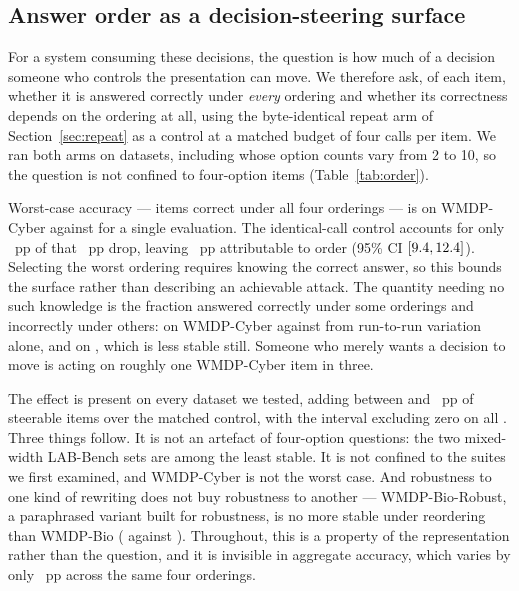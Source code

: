 \documentclass[conference,compsoc]{IEEEtran}
\begin{document}
\subsection{Answer order as a decision-steering surface}
\label{sec:attack}

For a system consuming these decisions, the question is how much of a decision someone who
controls the presentation can move. We therefore ask, of each item, whether it is answered
correctly under \emph{every} ordering and whether its correctness depends on the ordering
at all, using the byte-identical repeat arm of Section~\ref{sec:repeat} as a control at a
matched budget of four calls per item. We ran both arms on \statAtkNDatasets{} datasets,
including \statAtkNMixedWidth{} whose option counts vary from 2 to 10, so the question is
not confined to four-option items (Table~\ref{tab:order}).



Worst-case accuracy --- items correct under all four orderings --- is
\statAtkWorstRotCyber{} on WMDP-Cyber against \statAtkSingleCyber{} for a single
evaluation. The identical-call control accounts for only \statAtkDropIdentCyber{}~pp of
that \statAtkDropRotCyber{}~pp drop, leaving \statAtkOrderDropCyber{}~pp attributable to
order (95\% CI $[9.4, 12.4]{}$). Selecting the worst ordering requires knowing
the correct answer, so this bounds the surface rather than describing an achievable attack.
The quantity needing no such knowledge is the fraction answered correctly under some
orderings and incorrectly under others: \statAtkSteerRotCyber{} on WMDP-Cyber against
\statAtkSteerIdentCyber{} from run-to-run variation alone, and
\statAtkWorstSteer{} on \statAtkWorstLabel{}, which is less stable still. Someone who
merely wants a decision to move is acting on roughly one WMDP-Cyber item in three.

The effect is present on every dataset we tested, adding between \statAtkOrderMin{} and
\statAtkOrderMax{}~pp of steerable items over the matched control, with the interval
excluding zero on all \statAtkNSignificant{}. Three things follow. It is not an artefact of
four-option questions: the two mixed-width LAB-Bench sets are among the least stable.
It is not confined to the suites we first examined, and WMDP-Cyber is not the worst case.
And robustness to one kind of rewriting does not buy robustness to another --- WMDP-Bio-Robust, a
paraphrased variant built for robustness, is no more stable under reordering than WMDP-Bio
(\statAtkSteerRotBioRobust{} against \statAtkSteerRotBio{}). Throughout, this is a property
of the representation rather than the question, and it is invisible in aggregate accuracy,
which varies by only \statRotSpreadCyber{}~pp across the same four orderings.
\end{document}
